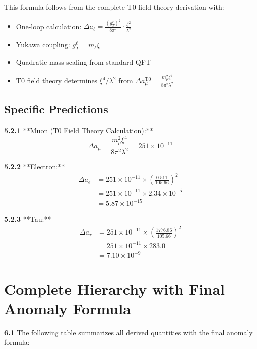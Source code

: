 \documentclass[12pt,a4paper]{article}
\begin{document}
	This formula follows from the complete T0 field theory derivation with:
	\begin{itemize}
		\item One-loop calculation: $\Delta a_\ell = \frac{(g_T^\ell)^2}{8\pi^2} \cdot \frac{\xi^2}{\lambda^2}$
		\item Yukawa coupling: $g_T^\ell = m_\ell \xi$
		\item Quadratic mass scaling from standard QFT
		\item T0 field theory determines $\xi^4/\lambda^2$ from $\Delta a_\mu^{\text{T0}} = \frac{m_\mu^2 \xi^4}{8\pi^2 \lambda^2}$
	\end{itemize}
	
	\subsection{Specific Predictions}
	
	\noindent \textbf{5.2.1} **Muon (T0 Field Theory Calculation):**
	\begin{equation}
		\Delta a_\mu = \frac{m_\mu^2 \xi^4}{8\pi^2 \lambda^2} = 251 \times 10^{-11}
	\end{equation}
	
	\noindent \textbf{5.2.2} **Electron:**
	\begin{align}
		\Delta a_e &= 251 \times 10^{-11} \times \left(\frac{0.511}{105.66}\right)^2 \\
		&= 251 \times 10^{-11} \times 2.34 \times 10^{-5} \\
		&= 5.87 \times 10^{-15}
	\end{align}
	
	\noindent \textbf{5.2.3} **Tau:**
	\begin{align}
		\Delta a_\tau &= 251 \times 10^{-11} \times \left(\frac{1776.86}{105.66}\right)^2 \\
		&= 251 \times 10^{-11} \times 283.0 \\
		&= 7.10 \times 10^{-9}
	\end{align}
	
	\section{Complete Hierarchy with Final Anomaly Formula}
	
	\noindent \textbf{6.1} The following table summarizes all derived quantities with the final anomaly formula:
	
\end{document}
